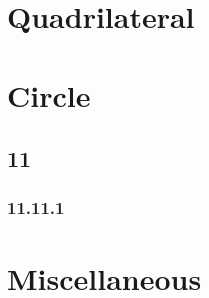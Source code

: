 \documentclass[11pt]{book}
\begin{document}
\chapter{Quadrilateral}

%
\chapter{Circle}
\section{11}
\subsection{11.11.1}


\chapter{Miscellaneous }

\iffalse
% 
\backmatter
\appendix
\chapter{Area of a Circle}

\fi
%
%

%
%
%
\latexprintindex
\end{document}
